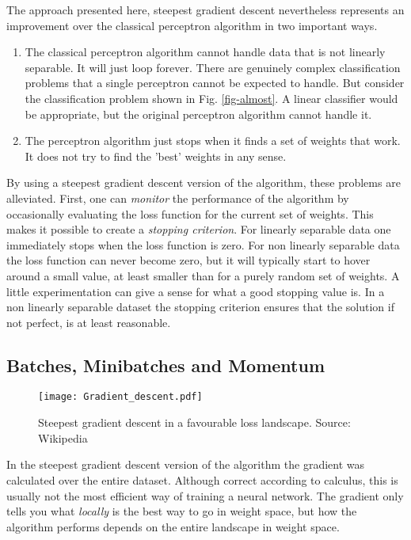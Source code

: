   The approach presented here, steepest gradient descent nevertheless represents an  improvement over the classical perceptron algorithm in two important ways.
  \begin{enumerate}
  \item The classical perceptron algorithm cannot handle data that is not linearly separable. It will just loop forever. There are genuinely
    complex classification problems that a single perceptron cannot be expected to handle. But consider the classification problem shown in
    Fig. \ref{fig-almost}. A linear classifier would be appropriate, but the original perceptron algorithm cannot handle it.

  \item The perceptron algorithm just stops when it finds a set of weights that work. It does not try to find the 'best' weights in any
    sense.
  \end{enumerate}

  By using a steepest gradient descent version of the algorithm, these problems are alleviated. First, one can \emph{monitor} the performance of the algorithm by
  occasionally evaluating the loss function for the current set of weights. This makes it possible to create a \emph{stopping criterion}. For linearly
  separable data one immediately stops when the loss function is zero. For non linearly separable data the loss function can never become zero,
  but  it will typically start to hover around a small value, at least smaller than for a purely random set of weights. A little experimentation can give
  a sense for what a good stopping value is. In a non linearly separable dataset the stopping criterion ensures that the solution if not perfect, is at least reasonable.


  \subsection{Batches, Minibatches and Momentum }
  \begin{figure}[!ht]
    \begin{center}
      \texttt{[image: Gradient\_descent.pdf]}
    \end{center}
    \caption{Steepest gradient descent in a favourable loss landscape. Source: Wikipedia}
    \label{fig-sgdgood}
  \end{figure}

  In the steepest gradient descent version of the algorithm the gradient was calculated over the entire dataset. Although correct according to calculus, this is
  usually not the most efficient way of training a neural network. The gradient only tells you what \emph{locally} is the best way to go in weight space, but how the
  algorithm performs depends on the entire landscape in weight space.
  
